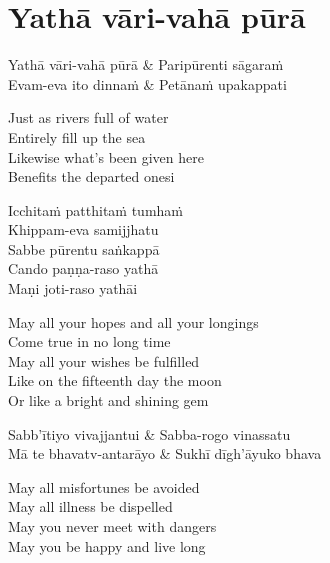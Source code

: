 \clearpage

\section{Yathā vāri-vahā pūrā}

\begin{twochants}
Yathā vāri-vahā pūrā & Paripūrenti sāgaraṁ\\
Evam-eva ito dinnaṁ & Petānaṁ upakappati\\
\end{twochants}

\begin{english}
Just as rivers full of water\\
Entirely fill up the sea\\
Likewise what’s been given here\\
Benefits the departed onesi
\end{english}


\begin{twochants}
Icchitaṁ patthitaṁ tumhaṁ\\
Khippam-eva samijjhatu\\
Sabbe pūrentu saṅkappā\\
Cando paṇṇa-raso yathā\\
Maṇi joti-raso yathāi
\end{twochants}

\begin{english}
May all your hopes and all your longings\\
Come true in no long time\\
May all your wishes be fulfilled\\
Like on the fifteenth day the moon\\
Or like a bright and shining gem
\end{english}

\begin{twochants}
Sabb’ītiyo vivajjantui & Sabba-rogo vinassatu\\
Mā te bhavatv-antarāyo & Sukhī dīgh’āyuko bhava
\end{twochants}

\begin{english}
May all misfortunes be avoided\\
May all illness be dispelled\\
May you never meet with dangers\\
May you be happy and live long
\end{english}

